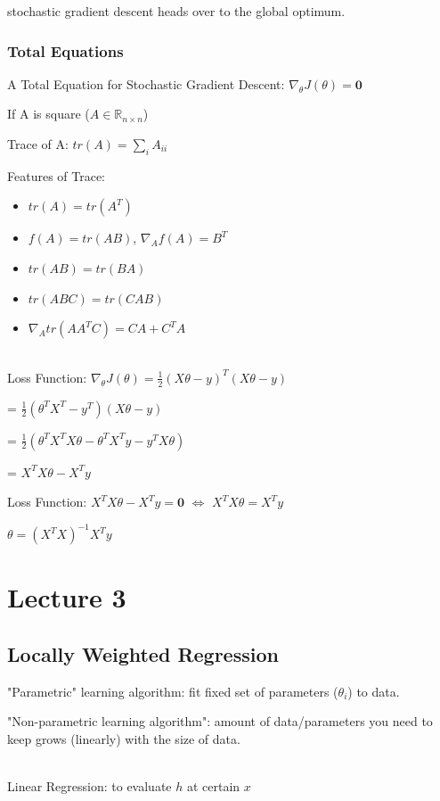 \documentclass{article}
\begin{document}
\noindent
stochastic gradient descent heads over to the global optimum.

\subsubsection{Total Equations}

A Total Equation for Stochastic Gradient Descent: $\nabla_{\theta}J(\theta) = \boldsymbol{0}$

\noindent
If A is square ($A \in \mathbb{R}_{n \times n}$)

Trace of A: $tr(A) = \sum\limits_{i}A_{ii}$

\noindent
Features of Trace:
\begin{itemize}[leftmargin=*, nosep]
    \item $tr(A) = tr(A^T)$
    \item $f(A) = tr(AB)$, $\nabla_{A}f(A) = B^T$
    \item $tr(AB) = tr(BA)$
    \item $tr(ABC) = tr(CAB)$
    \item $\nabla_{A}tr(AA^TC) = CA + C^TA$
\end{itemize}


~\\
\noindent
Loss Function: $\nabla_{\theta}J(\theta) = \frac{1}{2}(X\theta-y)^T(X\theta-y)$

\noindent
= $\frac{1}{2}(\theta^TX^T-y^T)(X\theta-y)$

\noindent
= $\frac{1}{2}(\theta^TX^TX\theta-\theta^TX^Ty-y^TX\theta)$

\noindent
= $X^TX\theta - X^Ty$

\noindent
Loss Function: $X^TX\theta - X^Ty = \boldsymbol{0}$ $\iff$ 
$X^TX\theta = X^Ty$

\noindent
$\theta = (X^TX)^{-1}X^Ty$

\section{Lecture 3}
\subsection{Locally Weighted Regression}
"Parametric" learning algorithm: fit fixed set of parameters ($\theta_i$) to data.

\noindent
"Non-parametric learning algorithm": amount of data/parameters you need to keep grows (linearly) with the size of data.

~\\
\noindent
Linear Regression: to evaluate $h$ at certain $x$
\end{document}
